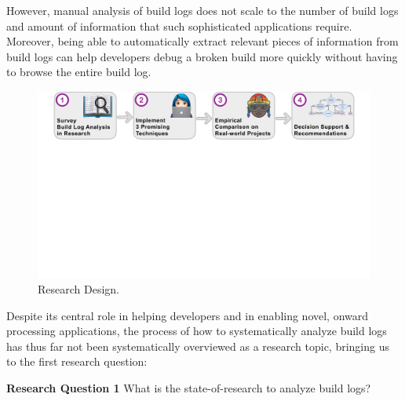 However, manual analysis of build logs does not
scale to the number of build logs and amount of information that such
sophisticated applications require.
Moreover, being able to
automatically extract relevant pieces of information from build logs
can help
developers debug a broken build more quickly without having to browse
the entire build log.

\begin{figure}[htb]
	\centering
	\includegraphics[width=\textwidth, trim={1.2cm 10.5cm 1.2cm 0cm},
	clip]{img/overview.pdf}
	\caption{Research Design.}
	\label{fig:overview}
\end{figure}

Despite its central role in helping developers and in enabling
novel, onward processing applications,
the process of how to
systematically
analyze build logs has thus far not been systematically
overviewed as a research topic, bringing us to the first
research question:
\begin{simplebox}[minipage boxed title*=-5cm]{\textbf{Research Question
1}}
What is the state-of-research to analyze build logs?
\end{simplebox}

